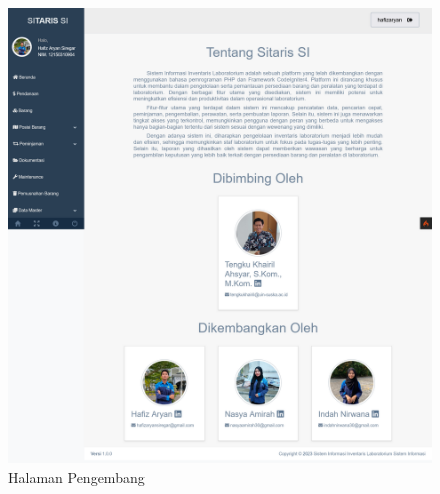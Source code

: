 \begin{enumerate}
        \begin{figure}
          \centering
          \includegraphics[width=0.82\linewidth]{konten//gambar/pengembang.png}
          \caption{Halaman Pengembang}
          \label{fig:enter-label}
        \end{figure}

\end{enumerate}
